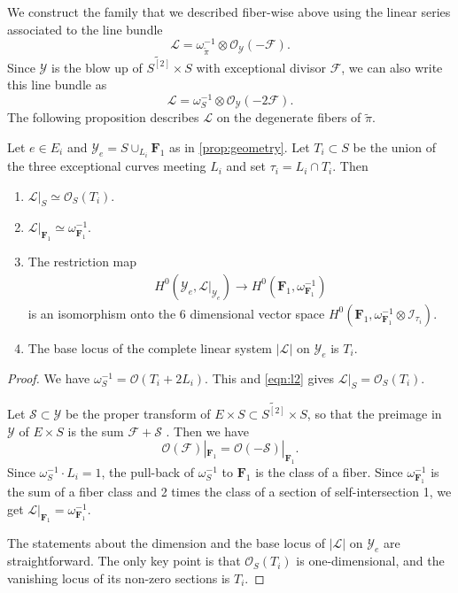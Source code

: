 \documentclass[12pt,reqno]{amsart}
\renewcommand{\to}{{\longrightarrow}}
\numberwithin{equation}{section}
\renewcommand{\O}{\mathcal O}
\newcommand{\F}{\mathbf F}
\begin{document}
We construct the family that we described fiber-wise above using the linear series associated to the line bundle
\begin{equation}\label{eqn:l1}
  \mathcal L = \omega_{\widetilde \pi}^{-1} \otimes \O_{\mathcal Y}(-\mathcal F).
\end{equation}
Since $\mathcal Y$ is the blow up of $\widetilde{S^{[2]}} \times S$ with exceptional divisor $\mathcal F$, we can also write this line bundle as
\begin{equation}\label{eqn:l2}
  \mathcal L = \omega_{S}^{-1} \otimes \O_{\mathcal Y}(-2\mathcal F).
\end{equation}
The following proposition describes $\mathcal L$ on the degenerate fibers of $\widetilde \pi$.
\begin{proposition}
  \label{prop:LYe}
  Let $e \in E_{i}$ and $\mathcal{Y}_{e} = S \cup_{L_{i}} \F_{1}$ as in \autoref{prop:geometry}.
  Let $T_i \subset S$ be the union of the three exceptional curves meeting $L_i$ and set $\tau_i = L_i \cap T_i$.
  Then
  \begin{enumerate}
  \item $\mathcal{L}|_{S} \simeq \O_{S}(T_{i})$. 
  \item $\mathcal{L}|_{\F_{1}} \simeq \omega_{\F_1}^{-1}$.
  \item The restriction map
  \begin{align}
    \label{eq:restrL}
    H^{0}(\mathcal{Y}_{e}, \mathcal{L}|_{\mathcal{Y}_{e}}) \to H^{0}(\F_{1}, \omega_{\F_1}^{-1})
  \end{align}
  is an isomorphism onto the $6$ dimensional vector space
  $H^{0}\left(\F_{1}, \omega_{\F_1}^{-1}\otimes \mathcal{I}_{\tau_{i}}\right).$
\item The base locus of the complete linear system $|\mathcal L|$ on $\mathcal Y_e$ is $T_i$.
  \end{enumerate}
\end{proposition}
\begin{proof}
  We have $\omega_S^{-1} = \O(T_i + 2L_i)$.
  This and \eqref{eqn:l2} gives $\mathcal L|_S = \O_S(T_i)$.

  Let $\mathcal S \subset \mathcal Y$ be the proper transform of $E \times S \subset \widetilde{S^{[2]}} \times S$, so that the preimage in $\mathcal Y$ of $E \times S$ is the sum $\mathcal F + \mathcal S$  .
  Then we have
  \[\O(\mathcal F)|_{\F_1} = \O(-\mathcal S)|_{\F_1}.\]
  Since $\omega_S^{-1} \cdot L_i = 1$, the pull-back of $\omega_S^{-1}$ to $\F_1$ is the class of a fiber.
  Since $\omega^{-1}_{\F_1}$ is the sum of a fiber class and 2 times the class of a section of self-intersection 1, we get $\mathcal L|_{\F_1} = \omega_{\F_1}^{-1}$.

  The statements about the dimension and the base locus of $|\mathcal L|$ on $\mathcal Y_e$ are straightforward.
  The only key point is that $\O_S(T_i)$ is one-dimensional, and the vanishing locus of its non-zero sections is $T_i$.
\end{proof}
\end{document}
